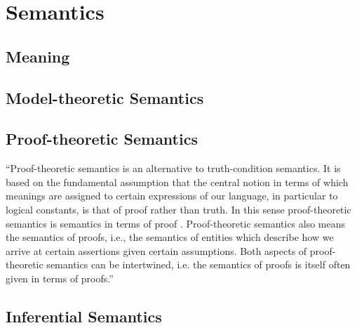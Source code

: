 \section{Semantics}
\label{sect:semantics}

\subsection{Meaning}
\label{subs:meaning}

\subsection{Model-theoretic Semantics}
\label{subs:modeltheorysem}

\subsection{Proof-theoretic Semantics}
\label{subs:proofsem}

``Proof-theoretic semantics is an alternative to truth-condition semantics. It is based on the fundamental assumption that the central notion in terms of which meanings are assigned to certain expressions of our language, in particular to logical constants, is that of proof rather than truth. In this sense proof-theoretic semantics is semantics in terms of proof . Proof-theoretic semantics also means the semantics of proofs, i.e., the semantics of entities which describe how we arrive at certain assertions given certain assumptions. Both aspects of proof-theoretic semantics can be intertwined, i.e. the semantics of proofs is itself often given in terms of proofs.''\cite{schroeder-heister_proof-theoretic_sep}


\subsection{Inferential Semantics}
\label{subs:inferensem}

